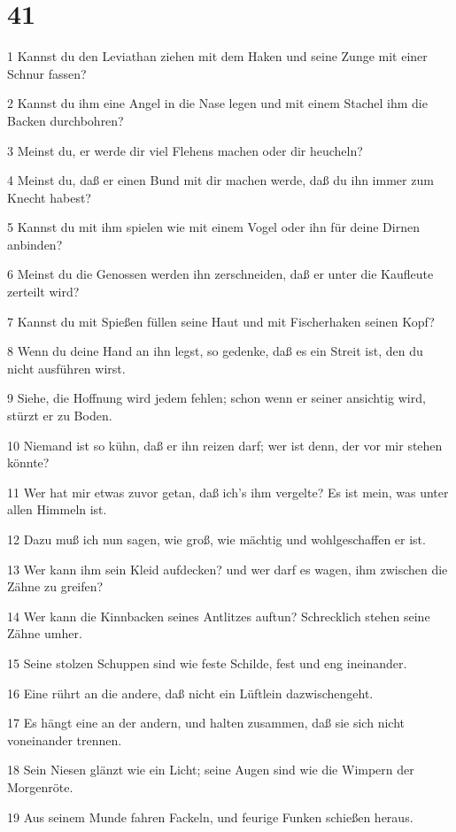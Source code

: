 \chapter{41}

\par 1 Kannst du den Leviathan ziehen mit dem Haken und seine Zunge mit einer Schnur fassen?
\par 2 Kannst du ihm eine Angel in die Nase legen und mit einem Stachel ihm die Backen durchbohren?
\par 3 Meinst du, er werde dir viel Flehens machen oder dir heucheln?
\par 4 Meinst du, daß er einen Bund mit dir machen werde, daß du ihn immer zum Knecht habest?
\par 5 Kannst du mit ihm spielen wie mit einem Vogel oder ihn für deine Dirnen anbinden?
\par 6 Meinst du die Genossen werden ihn zerschneiden, daß er unter die Kaufleute zerteilt wird?
\par 7 Kannst du mit Spießen füllen seine Haut und mit Fischerhaken seinen Kopf?
\par 8 Wenn du deine Hand an ihn legst, so gedenke, daß es ein Streit ist, den du nicht ausführen wirst.
\par 9 Siehe, die Hoffnung wird jedem fehlen; schon wenn er seiner ansichtig wird, stürzt er zu Boden.
\par 10 Niemand ist so kühn, daß er ihn reizen darf; wer ist denn, der vor mir stehen könnte?
\par 11 Wer hat mir etwas zuvor getan, daß ich's ihm vergelte? Es ist mein, was unter allen Himmeln ist.
\par 12 Dazu muß ich nun sagen, wie groß, wie mächtig und wohlgeschaffen er ist.
\par 13 Wer kann ihm sein Kleid aufdecken? und wer darf es wagen, ihm zwischen die Zähne zu greifen?
\par 14 Wer kann die Kinnbacken seines Antlitzes auftun? Schrecklich stehen seine Zähne umher.
\par 15 Seine stolzen Schuppen sind wie feste Schilde, fest und eng ineinander.
\par 16 Eine rührt an die andere, daß nicht ein Lüftlein dazwischengeht.
\par 17 Es hängt eine an der andern, und halten zusammen, daß sie sich nicht voneinander trennen.
\par 18 Sein Niesen glänzt wie ein Licht; seine Augen sind wie die Wimpern der Morgenröte.
\par 19 Aus seinem Munde fahren Fackeln, und feurige Funken schießen heraus.
